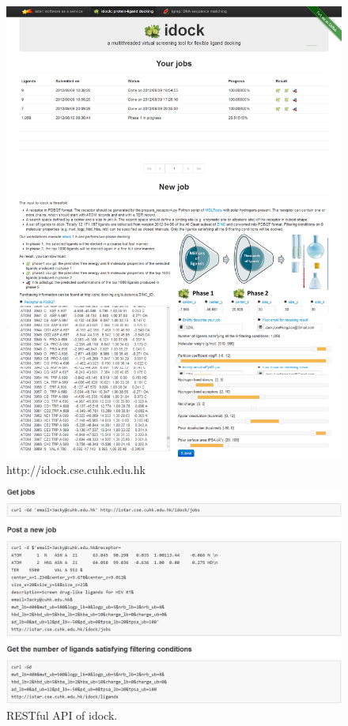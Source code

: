 \begin{figure}
\centering
\includegraphics[width=\linewidth]{istar/idock.png}
\caption{http://idock.cse.cuhk.edu.hk}
\label{istar:idock}
\end{figure}

\begin{figure}
\centering
\includegraphics[width=\linewidth]{istar/idock-rest.png}
\caption{RESTful API of idock.}
\label{istar:idock-rest}
\end{figure}

